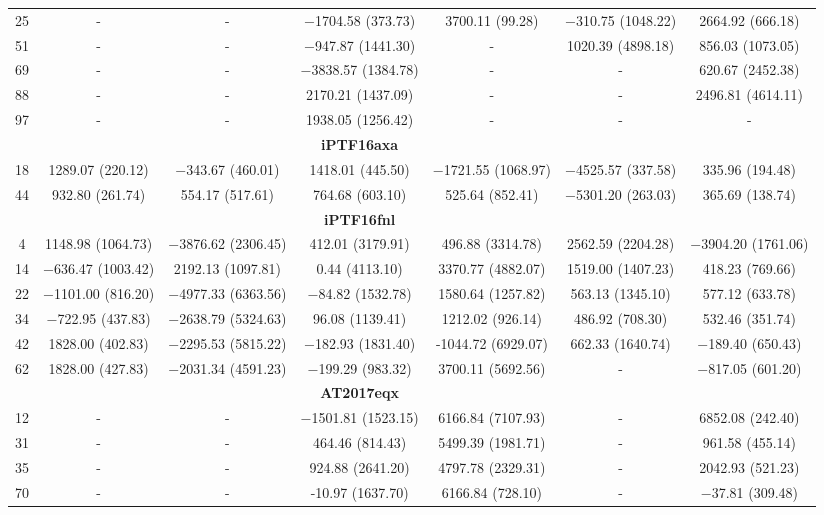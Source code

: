 \documentclass[structabstract]{aa}
\begin{document}
\begin{small}
\begin{longtable}{c c c c c c c}
25	&	-	&	-	&	$-$1704.58 (373.73)	&	3700.11 (99.28)	&	$-$310.75 (1048.22)	&	2664.92 (666.18)  \\
51	&	-	&	-	&	$-$947.87 (1441.30)	&	-	&	1020.39 (4898.18)	&	856.03 (1073.05)  \\
69	&	-	&	-	&	$-$3838.57 (1384.78)	&	-	&	-	&	620.67 (2452.38)  \\
88	&	-	&	-	&	2170.21 (1437.09)	&	-	&	-	&	2496.81 (4614.11)  \\
97	&	-	&	-	&	1938.05 (1256.42)	&	-	&	-	&	- \\ \hline
	&		&		&	\textbf{iPTF16axa}	&		&		&	\\ \hline
18	&	1289.07 (220.12)	&	$-$343.67 (460.01)	&	1418.01 (445.50)	&	$-$1721.55 (1068.97)	&	$-$4525.57 (337.58)	&	335.96 (194.48)  \\
44	&	932.80 (261.74)	&	554.17 (517.61)	&	764.68 (603.10)	&	525.64 (852.41)	&	$-$5301.20 (263.03)	&	365.69 (138.74)  \\ \hline
	&		&		&	\textbf{iPTF16fnl}	&		&		&	\\ \hline
4	&	1148.98 (1064.73)	&	$-$3876.62 (2306.45)	&	412.01 (3179.91)	&	496.88 (3314.78)	&	2562.59 (2204.28)	&	$-$3904.20 (1761.06)  \\
14	&	$-$636.47 (1003.42)	&	2192.13 (1097.81)	&	0.44 (4113.10)	&	3370.77 (4882.07)	&	1519.00 (1407.23)	&	418.23 (769.66)  \\
22	&	$-$1101.00 (816.20)	&	$-$4977.33 (6363.56)	&	$-$84.82 (1532.78)	&	1580.64 (1257.82)	&	563.13 (1345.10)	&	577.12 (633.78)  \\
34	&	$-$722.95 (437.83)	&	$-$2638.79 (5324.63)	&	96.08 (1139.41)	&	1212.02 (926.14)	&	486.92 (708.30)	&	532.46 (351.74)  \\
42	&	1828.00 (402.83)	&	$-$2295.53 (5815.22)	&	$-$182.93 (1831.40)	&	-1044.72 (6929.07)	&	662.33 (1640.74)	&	$-$189.40 (650.43)  \\
62	&	1828.00 (427.83)	&	$-$2031.34 (4591.23)	&	$-$199.29 (983.32)	&	3700.11 (5692.56)	&	-	&	$-$817.05 (601.20)  \\ \hline
	&		&		&	\textbf{AT2017eqx}	&		&		&	\\ \hline
12	&	-	&	-	&	$-$1501.81 (1523.15)	&	6166.84 (7107.93)	&	-	&	6852.08 (242.40)  \\
31	&	-	&	-	&	464.46 (814.43)	&	5499.39 (1981.71)	&	-	&	961.58 (455.14)  \\
35	&	-	&	-	&	924.88 (2641.20)	&	4797.78 (2329.31)	&	-	&	2042.93 (521.23)  \\
70	&	-	&	-	&	-10.97 (1637.70)	&	6166.84 (728.10)	&	-	&	$-$37.81 (309.48)  \\

\end{longtable}
\end{small}
\end{document}
